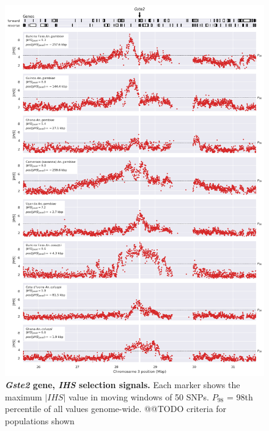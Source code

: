 \documentclass[a4paper,11pt,abstracton,hidelinks]{scrartcl}
\begin{document}
\begin{figure}[t!]
	\begin{center}
		\includegraphics*[width=1\linewidth,center]{artwork/locus_gste2_ihs_pdist.png}
	\end{center}
	\caption[\textit{Gste2} gene, \textit{IHS} selection signals]{
	\textbf{\textit{Gste2} gene, \textit{IHS} selection signals.}
	Each marker shows the maximum $|IHS|$ value in moving windows of 50 SNPs. 
	$P_{98}$ = 98th percentile of all values genome-wide.
	@@TODO criteria for populations shown
	} 
	\label{fig:locus_gste2_ihs}
\end{figure}
\end{document}
